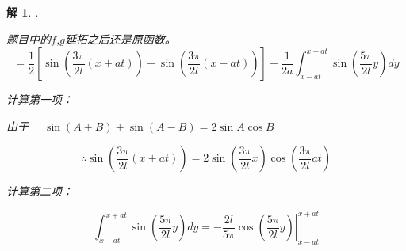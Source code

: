 \documentclass[12pt,a4paper]{article}
\newtheorem*{solution}{解}
\begin{document}
\begin{solution}
                                                                                                                                                                                                                                                                                                                                                                                                                                                                                                                                                                                                                                                                                                                                                                                                                                                                                                                                                                                                                                                                                                                                                                                                                                                                                                                                                                                                                                                                                                                                                                                                                           .

	题目中的$f$,$g$延拓之后还是原函数。
	\begin{equation*}
		= \frac{1}{2} \left[ \sin\left( \frac{3\pi}{2l}(x + at) \right) + \sin\left( \frac{3\pi}{2l}(x - at) \right) \right]	+ \frac{1}{2a} \int_{x - at}^{x + at} \sin\left( \frac{5\pi}{2l} y \right) dy
	\end{equation*}
	


计算第一项：

由于 $\quad \sin(A + B) + \sin(A - B) = 2 \sin A \cos B$

	
	\begin{equation*}
		\therefore \sin\left( \frac{3\pi}{2l}(x + at) \right) = 2 \sin\left( \frac{3\pi}{2l} x \right) \cos\left( \frac{3\pi}{2l} at \right)
	\end{equation*}
	
	计算第二项：
	
	\begin{equation*}
		\int_{x - at}^{x + at} \sin\left( \frac{5\pi}{2l} y \right) dy	= \left. -\frac{2l}{5\pi} \cos\left( \frac{5\pi}{2l} y \right) \right|_{x - at}^{x + at}
	\end{equation*}
	

\end{solution}
\end{document}
